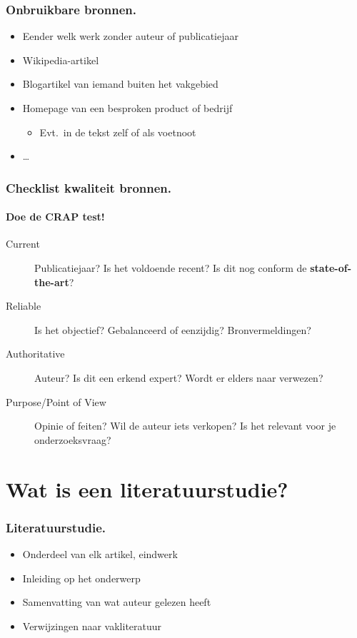 \documentclass[aspectratio=169]{beamer}
\begin{document}
\begin{frame}
  \frametitle{Onbruikbare bronnen.}

  \begin{itemize}
    \item Eender welk werk zonder auteur of publicatiejaar
    \item Wikipedia-artikel
    \item Blogartikel van iemand buiten het vakgebied
    \item Homepage van een besproken product of bedrijf
    \begin{itemize}
      \item Evt.~in de tekst zelf of als voetnoot
    \end{itemize}
    \item \dots
  \end{itemize}
\end{frame}

\begin{frame}
  \frametitle{Checklist kwaliteit bronnen.}
  \framesubtitle{Doe de CRAP test!}

  \begin{description}
    \item[Current] Publicatiejaar? Is het voldoende recent? Is dit nog conform de \textbf{state-of-the-art}?
    \item[Reliable] Is het objectief? Gebalanceerd of eenzijdig?
    Bronvermeldingen?
    \item[Authoritative] Auteur? Is dit een erkend expert? Wordt er elders naar verwezen?
    \item[Purpose/Point of View] Opinie of feiten? Wil de auteur iets verkopen? Is het relevant voor je onderzoeksvraag?
  \end{description}

\end{frame}

\section{Wat is een literatuurstudie?}

\begin{frame}
  \frametitle{Literatuurstudie.}

  \begin{itemize}
    \item Onderdeel van elk artikel, eindwerk
    \item Inleiding op het onderwerp
    \item Samenvatting van wat auteur gelezen heeft
    \item Verwijzingen naar vakliteratuur
  \end{itemize}

\end{frame}
\end{document}
